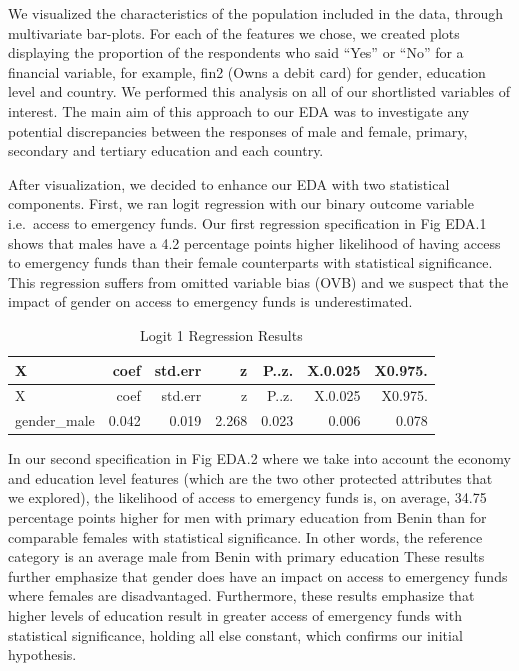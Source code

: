 \documentclass[12pt]{article}
\begin{document}
We visualized the characteristics of the population included in the
data, through multivariate bar-plots. For each of the features we chose,
we created plots displaying the proportion of the respondents who said
``Yes'' or ``No'' for a financial variable, for example, fin2 (Owns a
debit card) for gender, education level and country. We performed this
analysis on all of our shortlisted variables of interest. The main aim
of this approach to our EDA was to investigate any potential
discrepancies between the responses of male and female, primary,
secondary and tertiary education and each country.

After visualization, we decided to enhance our EDA with two statistical
components. First, we ran logit regression with our binary outcome
variable i.e.~access to emergency funds. Our first regression
specification in Fig EDA.1 shows that males have a 4.2 percentage points
higher likelihood of having access to emergency funds than their female
counterparts with statistical significance. This regression suffers from
omitted variable bias (OVB) and we suspect that the impact of gender on
access to emergency funds is underestimated.

\begin{longtable}[]{@{}lrrrrrr@{}}
\caption{Logit 1 Regression Results}\tabularnewline
\toprule\noalign{}
X & coef & std.err & z & P..z. & X.0.025 & X0.975. \\
\midrule\noalign{}
\endfirsthead
\toprule\noalign{}
X & coef & std.err & z & P..z. & X.0.025 & X0.975. \\
\midrule\noalign{}
\endhead
\bottomrule\noalign{}
\endlastfoot
gender\_male & 0.042 & 0.019 & 2.268 & 0.023 & 0.006 & 0.078 \\
\end{longtable}

In our second specification in Fig EDA.2 where we take into account the
economy and education level features (which are the two other protected
attributes that we explored), the likelihood of access to emergency
funds is, on average, 34.75 percentage points higher for men with
primary education from Benin than for comparable females with
statistical significance. In other words, the reference category is an
average male from Benin with primary education These results further
emphasize that gender does have an impact on access to emergency funds
where females are disadvantaged. Furthermore, these results emphasize
that higher levels of education result in greater access of emergency
funds with statistical significance, holding all else constant, which
confirms our initial hypothesis.
\end{document}
